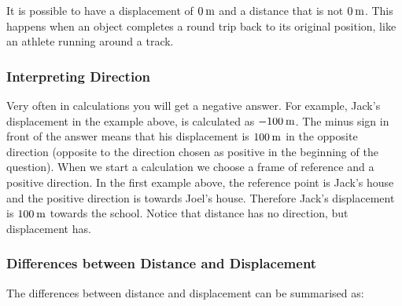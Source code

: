       \par 
      \label{m38788*id63886}It is possible to have a displacement of \begin{math}0\phantom{\rule{2pt}{0ex}}\mathrm{m}\end{math} and a distance that is not \begin{math}0\phantom{\rule{2pt}{0ex}}\mathrm{m}\end{math}. This happens when an object completes a round trip back to its original position, like an athlete running around a track.\par 
      \label{m38788*uid18}
            \subsubsection{ Interpreting Direction}
            \nopagebreak
            
        
        \label{m38788*id63901}Very often in calculations you will get a negative answer. For example, Jack's displacement in the example above, is calculated as \begin{math}-100\phantom{\rule{2pt}{0ex}}\mathrm{m}\end{math}. The minus sign in front of the answer means that his displacement is \begin{math}100\phantom{\rule{2pt}{0ex}}\mathrm{m}\end{math} in the opposite direction (opposite to the direction chosen as positive in the beginning of the question). When we start a calculation we choose a frame of reference and a positive direction. In the first example above, the reference point is Jack's house and the positive direction is towards Joel's house. Therefore Jack's displacement is \begin{math}100\phantom{\rule{2pt}{0ex}}\mathrm{m}\end{math} towards the school. Notice that distance has no direction, but displacement has.\par 
      
      \label{m38788*uid19}
            \subsubsection{ Differences between Distance and Displacement}
            \nopagebreak
            
        \label{m38788*id63938}The differences between distance and displacement can be summarised as:\par 
        
